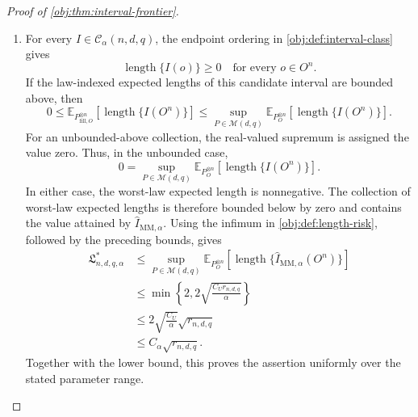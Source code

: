 \begin{proof}[Proof of \cref{obj:thm:interval-frontier}]
\begin{enumerate}
\item For every \(I\in\mathcal C_\alpha(n,d,q)\), the endpoint ordering in \cref{obj:def:interval-class} gives
\[
\operatorname{length}\{I(o)\}\ge0
\quad\text{for every }o\in O^n.
\]
If the law-indexed expected lengths of this candidate interval are bounded above, then
\[
0\le
\mathbb E_{P_{\mathrm{fill},O}^{\otimes n}}
\left[\operatorname{length}\{I(O^n)\}\right]
\le
\sup_{P\in\mathcal M(d,q)}
\mathbb E_{P_O^{\otimes n}}
\left[\operatorname{length}\{I(O^n)\}\right].
\]
For an unbounded-above collection, the real-valued supremum is assigned the value zero. Thus, in the unbounded case,
\[
0=
\sup_{P\in\mathcal M(d,q)}
\mathbb E_{P_O^{\otimes n}}
\left[\operatorname{length}\{I(O^n)\}\right].
\]
In either case, the worst-law expected length is nonnegative. The collection of worst-law expected lengths is therefore bounded below by zero and contains the value attained by \(\widehat I_{\mathrm{MM},\alpha}\). Using the infimum in \cref{obj:def:length-risk}, followed by the preceding bounds, gives
\[
\begin{aligned}
\mathfrak L^*_{n,d,q,\alpha}
&\le
\sup_{P\in\mathcal M(d,q)}
\mathbb E_{P_O^{\otimes n}}
\left[
\operatorname{length}\{\widehat I_{\mathrm{MM},\alpha}(O^n)\}
\right]\\
&\le
\min\left\{2,2\sqrt{\frac{C_Ur_{n,d,q}}{\alpha}}\right\}\\
&\le
2\sqrt{\frac{C_U}{\alpha}}\sqrt{r_{n,d,q}}\\
&\le C_\alpha\sqrt{r_{n,d,q}}.
\end{aligned}
\]
Together with the lower bound, this proves the assertion uniformly over the stated parameter range.
\end{enumerate}
\end{proof}

